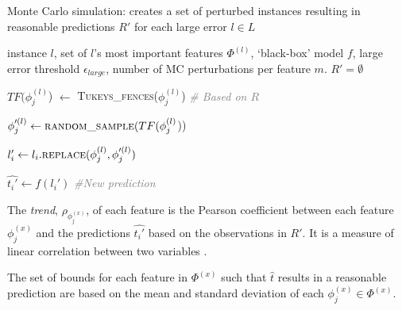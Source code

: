 \begin{algorithm}
    \caption{Monte Carlo simulation: creates a set of perturbed instances resulting in reasonable predictions $R'$ for each large error $l \in L$}
    \label{mcbrp}
    \begin{algorithmic}
      instance $l$, set of  $l$'s most important features $\Phi^{(l)}$, `black-box' model $f$, large error threshold $\epsilon_{large}$, number of MC perturbations per feature $m$. 
        \STATE $R' = \emptyset$ 	
        
            
                \STATE $TF(\phi_j^{(l)}$) $\gets$ \textsc{Tukeys\_fences}($\phi_j^{(l)}$) \qquad \textcolor{gray}{\textit{\# Based on $R$}} 
                
                
                    \STATE $\phi_j'^{(l)} \gets \textsc{random\_sample}(TF(\phi_j^{(l)}$))
                    
                    \STATE $l_i' \gets l_i.\textsc{replace}(\phi_j^{(l)}, \phi_j'^{(l)})$            
                      
                    \STATE $\hat{t_i'} \gets f(l_i')$ \qquad \textcolor{gray}{\textit{\#New prediction} }
                    
                    
                   \ENDIF                    
                \ENDFOR
            \ENDFOR
    \end{algorithmic}
\end{algorithm}




\begin{definition}\rm
The \emph{trend}, $\rho_{\phi_j^{(x)}}$, of each feature is the Pearson coefficient between each feature $\phi_j^{(x)}$ and the predictions $\hat{t_i'}$ based on the observations in $R'$. It is a measure of linear correlation between two variables \citep{swinscow-1997-stats}. 
\end{definition}

The set of bounds for each feature in $\Phi^{(x)}$ such that $\hat{t}$ results in a reasonable prediction are based on the mean and standard deviation of each $\phi_j^{(x)} \in \Phi^{(x)}$.


